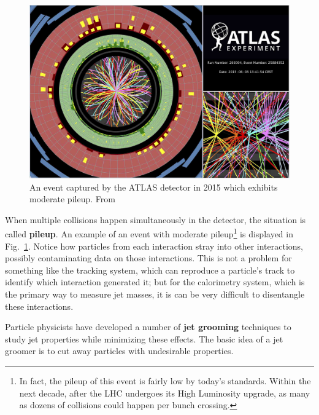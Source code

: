 \documentclass[../thesis.tex]{subfiles}
\begin{document}
	\begin{figure}
	\begin{center}
		\includegraphics[width=\textwidth]{figures/atlas_pile_up.jpeg}
		\caption{\label{technical-fig:pileup}An event captured by the ATLAS detector in 2015 which exhibits moderate pileup. From \cite{atlas_collaboration_event_nodate-1}}
	\end{center}
	\end{figure}

	When multiple collisions happen simultaneously in the detector, the situation is called \textbf{pileup}. An example of an event with moderate pileup\footnote{In fact, the pileup of this event is fairly low by today's standards. Within the next decade, after the LHC undergoes its High Luminosity upgrade, as many as dozens of collisions could happen per bunch crossing.} is displayed in Fig.~\ref{technical-fig:pileup}. Notice how particles from each interaction stray into other interactions, possibly contaminating data on those interactions. This is not a problem for something like the tracking system, which can reproduce a particle's track to identify which interaction generated it; but for the calorimetry system, which is the primary way to measure jet masses, it is can be very difficult to disentangle these interactions.

	Particle physicists have developed a number of \textbf{jet grooming} techniques to study jet properties while minimizing these effects. The basic idea of a jet groomer is to cut away particles with undesirable properties.
\end{document}
